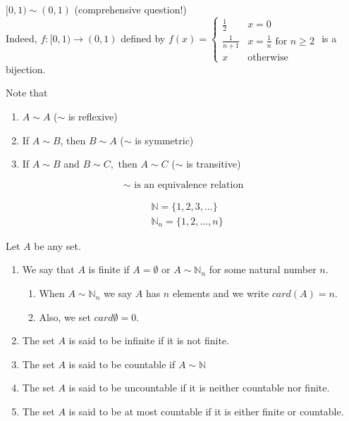 \begin{example} \leavevmode
    $[0,1) \sim (0, 1)$ (comprehensive question!) \\
    Indeed, $f:[0,1) \rightarrow (0,1)$ defined by $f(x)=
    \begin{cases}
        \frac{1}{2}&x=0 \\
        \frac{1}{n+1}&x=\frac{1}{n} \text{ for } n\geq 2 \\
        x &\text{otherwise}
    \end{cases}$ is a bijection.
\end{example}

\begin{remark}
    Note that
    \begin{enumerate}[$(i)$]
        \item $A \sim A$ ($\sim$ is reflexive)
        \item If $A\sim B$, then $B\sim A$ ($\sim$ is symmetric)
        \item If $A \sim B$ and $B \sim C,$ then $A\sim C$ ($\sim$ is transitive)
    \end{enumerate}
    $$\sim \text{ is an equivalence relation}$$
\end{remark}

\begin{notation}
    \begin{align*}
        &\mathbb{N}=\{1, 2, 3,...\} \\
        &\mathbb{N}_n=\{1, 2, ..., n\}
    \end{align*}
\end{notation}

\begin{definition}
    Let $A$ be any set.
    \begin{enumerate}[$(i)$]
        \item We say that $A$ is finite if $A=\emptyset$ or $A\sim \mathbb{N}_n$ for some natural number $n$.
        \begin{enumerate}
            \item When $A\sim \mathbb{N}_n$ we say $A$ has $n$ elements and we write $card(A)=n$.
            \item Also, we set $card\emptyset = 0.$
        \end{enumerate}
        \item The set $A$ is said to be infinite if it is not finite.
        \item The set $A$ is said to be countable if $A\sim \mathbb{N}$
        \item The set $A$ is said to be uncountable if it is neither countable nor finite.
        \item The set $A$ is said to be at most countable if it is either finite or countable.
    \end{enumerate}
\end{definition}